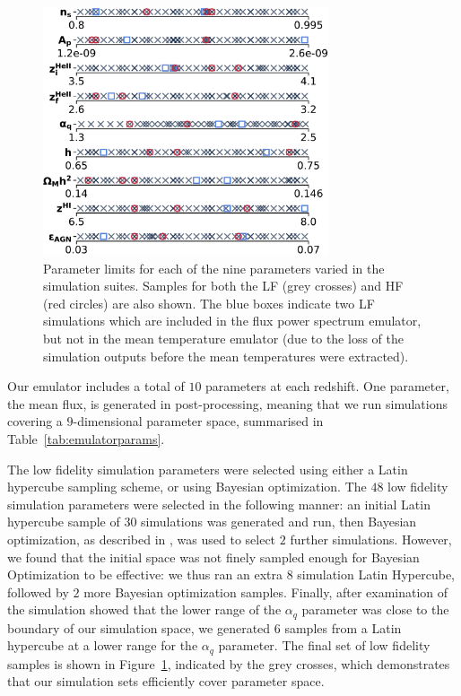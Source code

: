 \documentclass[a4paper,11pt]{article}
\begin{document}
\begin{figure}
    \centering
    \includegraphics[width=0.75\textwidth]{figures/sample_params.pdf}
    \caption{\label{fig:samples}
    Parameter limits for each of the nine parameters varied in the simulation suites.
    Samples for both the LF (grey crosses) and HF (red circles) are also shown.
    The blue boxes indicate two LF simulations which are included in the flux power spectrum emulator, but not in the mean temperature emulator (due to the loss of the simulation outputs before the mean temperatures were extracted).
    }
\end{figure}


Our emulator includes a total of $10$ parameters at each redshift. One parameter, the mean flux, is generated in post-processing, meaning that we run simulations covering a $9$-dimensional parameter space, summarised in Table~\ref{tab:emulatorparams}.

The low fidelity simulation parameters were selected using either a Latin hypercube sampling scheme, or using Bayesian optimization.
The $48$ low fidelity simulation parameters were selected in the following manner: an initial Latin hypercube sample of $30$ simulations was generated and run, then Bayesian optimization, as described in \cite{Rogers:2019}, was used to select $2$ further simulations.
However, we found that the initial space was not finely sampled enough for Bayesian Optimization to be effective: we thus ran an extra $8$ simulation Latin Hypercube, followed by $2$ more Bayesian optimization samples. Finally, after examination of the simulation showed that the lower range of the $\alpha_q$ parameter was close to the boundary of our simulation space, we generated $6$ samples from a Latin hypercube at a lower range for the $\alpha_q$ parameter.
The final set of low fidelity samples is shown in Figure~\ref{fig:samples}, indicated by the grey crosses, which demonstrates that our simulation sets efficiently cover parameter space.
\end{document}
